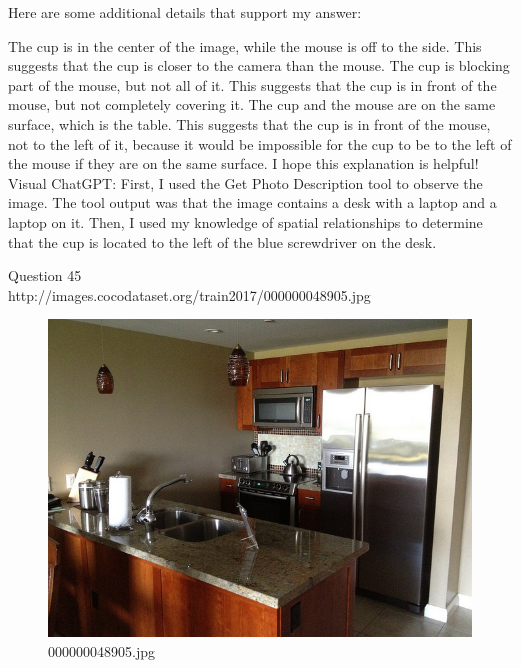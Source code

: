 \begin{enumerate}
    Here are some additional details that support my answer:

    The cup is in the center of the image, while the mouse is off to the side. This suggests that the cup is closer to the camera than the mouse.
    The cup is blocking part of the mouse, but not all of it. This suggests that the cup is in front of the mouse, but not completely covering it.
    The cup and the mouse are on the same surface, which is the table. This suggests that the cup is in front of the mouse, not to the left of it, because it would be impossible for the cup to be to the left of the mouse if they are on the same surface.
    I hope this explanation is helpful!
    \subitem Visual ChatGPT: First, I used the Get Photo Description tool to observe the image. The tool output was that the image contains a desk with a laptop and a laptop on it. Then, I used my knowledge of spatial relationships to determine that the cup is located to the left of the blue screwdriver on the desk.
\end{enumerate}
Question 45\\
http://images.cocodataset.org/train2017/000000048905.jpg
\begin{figure}[h]
    \centering
    \includegraphics[width=0.8\linewidth]{../image set/hard/000000048905.jpg}
    \caption{000000048905.jpg}
\end{figure}
